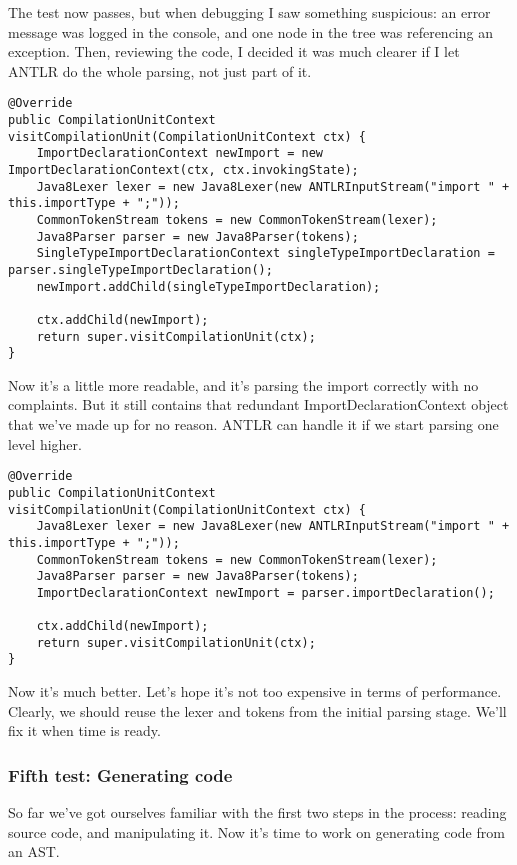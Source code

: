 \documentclass[11pt]{article}
\begin{document}
The test now passes, but when debugging I saw something suspicious: an error message was logged in the console, and one
node in the tree was referencing an exception. Then, reviewing the code, I decided it was much clearer if I let ANTLR
do the whole parsing, not just part of it.

\begin{verbatim}
@Override
public CompilationUnitContext visitCompilationUnit(CompilationUnitContext ctx) {
    ImportDeclarationContext newImport = new ImportDeclarationContext(ctx, ctx.invokingState);
    Java8Lexer lexer = new Java8Lexer(new ANTLRInputStream("import " + this.importType + ";"));
    CommonTokenStream tokens = new CommonTokenStream(lexer);
    Java8Parser parser = new Java8Parser(tokens);
    SingleTypeImportDeclarationContext singleTypeImportDeclaration = parser.singleTypeImportDeclaration();
    newImport.addChild(singleTypeImportDeclaration);

    ctx.addChild(newImport);
    return super.visitCompilationUnit(ctx);
}
\end{verbatim}

Now it's a little more readable, and it's parsing the import correctly with no complaints. But it still contains that redundant
ImportDeclarationContext object that we've made up for no reason. ANTLR can handle it if we start parsing one level higher.

\begin{verbatim}
@Override
public CompilationUnitContext visitCompilationUnit(CompilationUnitContext ctx) {
    Java8Lexer lexer = new Java8Lexer(new ANTLRInputStream("import " + this.importType + ";"));
    CommonTokenStream tokens = new CommonTokenStream(lexer);
    Java8Parser parser = new Java8Parser(tokens);
    ImportDeclarationContext newImport = parser.importDeclaration();

    ctx.addChild(newImport);
    return super.visitCompilationUnit(ctx);
}
\end{verbatim}

Now it's much better. Let's hope it's not too expensive in terms of performance. Clearly, we should reuse the lexer and tokens from the initial parsing stage. We'll fix it
when time is ready.

\subsubsection{Fifth test: Generating code}
\label{sec-1-3-5}

So far we've got ourselves familiar with the first two steps in the process: reading source code, and manipulating it. Now it's time to
work on generating code from an AST.
\end{document}
